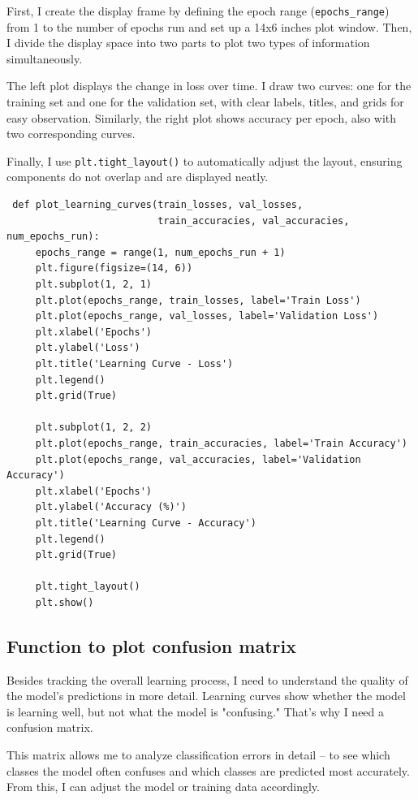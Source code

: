 \documentclass[12pt, a4paper, openany]{report}
\begin{document}
 First, I create the display frame by defining the epoch range (\texttt{epochs\_range}) from 1 to the number of epochs run and set up a 14x6 inches plot window. Then, I divide the display space into two parts to plot two types of information simultaneously.

 The left plot displays the change in loss over time. I draw two curves: one for the training set and one for the validation set, with clear labels, titles, and grids for easy observation. Similarly, the right plot shows accuracy per epoch, also with two corresponding curves.

 Finally, I use \texttt{plt.tight\_layout()} to automatically adjust the layout, ensuring components do not overlap and are displayed neatly.

 \begin{verbatim}
 def plot_learning_curves(train_losses, val_losses,
                          train_accuracies, val_accuracies, num_epochs_run):
     epochs_range = range(1, num_epochs_run + 1)
     plt.figure(figsize=(14, 6))
     plt.subplot(1, 2, 1)
     plt.plot(epochs_range, train_losses, label='Train Loss')
     plt.plot(epochs_range, val_losses, label='Validation Loss')
     plt.xlabel('Epochs')
     plt.ylabel('Loss')
     plt.title('Learning Curve - Loss')
     plt.legend()
     plt.grid(True)

     plt.subplot(1, 2, 2)
     plt.plot(epochs_range, train_accuracies, label='Train Accuracy')
     plt.plot(epochs_range, val_accuracies, label='Validation Accuracy')
     plt.xlabel('Epochs')
     plt.ylabel('Accuracy (%)')
     plt.title('Learning Curve - Accuracy')
     plt.legend()
     plt.grid(True)
     
     plt.tight_layout()
     plt.show()
 \end{verbatim}

 \subsection{Function to plot confusion matrix} %
 Besides tracking the overall learning process, I need to understand the quality of the model's predictions in more detail. Learning curves show whether the model is learning well, but not what the model is "confusing." That's why I need a confusion matrix.

 This matrix allows me to analyze classification errors in detail – to see which classes the model often confuses and which classes are predicted most accurately. From this, I can adjust the model or training data accordingly.
\end{document}
